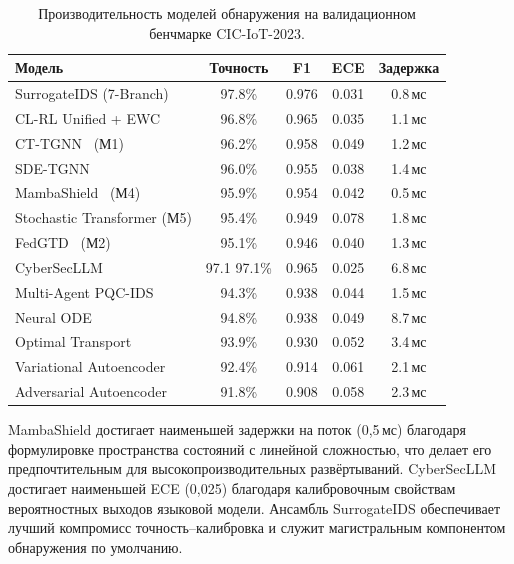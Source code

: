 \begin{table}[htbp]
\centering
\caption{Производительность моделей обнаружения на валидационном бенчмарке CIC-IoT-2023.}
\label{tab:platform_models}
\small
\begin{tabular}{lcccc}
\toprule
\textbf{Модель} & \textbf{Точность} & \textbf{F1} & \textbf{ECE} & \textbf{Задержка} \\
\midrule
SurrogateIDS (7-Branch)   & 97.8\% & 0.976 & 0.031 & 0.8\,мс \\
CL-RL Unified + EWC      & 96.8\% & 0.965 & 0.035 & 1.1\,мс \\
CT-TGNN~\cite{Anaedevha2025cais} (М1)              & 96.2\% & 0.958 & 0.049 & 1.2\,мс \\
SDE-TGNN~\cite{Anaedevha2026sdetgnn}                  & 96.0\% & 0.955 & 0.038 & 1.4\,мс \\
MambaShield~\cite{Anaedevha2026mamba} (М4)          & 95.9\% & 0.954 & 0.042 & 0.5\,мс \\
Stochastic Transformer (М5) & 95.4\% & 0.949 & 0.078 & 1.8\,мс \\
FedGTD~\cite{Anaedevha2026neurips} (М2)               & 95.1\% & 0.946 & 0.040 & 1.3\,мс \\
CyberSecLLM~\cite{Anaedevha2026cybersecllm}               & 97.1 97.1\% & 0.965 & 0.025 & 6.8\,мс \\
Multi-Agent PQC-IDS       & 94.3\% & 0.938 & 0.044 & 1.5\,мс \\
Neural ODE                & 94.8\% & 0.938 & 0.049 & 8.7\,мс \\
Optimal Transport         & 93.9\% & 0.930 & 0.052 & 3.4\,мс \\
Variational Autoencoder   & 92.4\% & 0.914 & 0.061 & 2.1\,мс \\
Adversarial Autoencoder   & 91.8\% & 0.908 & 0.058 & 2.3\,мс \\
\bottomrule
\end{tabular}
\end{table}

MambaShield достигает наименьшей задержки на поток (0,5\,мс) благодаря формулировке пространства состояний с линейной сложностью, что делает его предпочтительным для высокопроизводительных развёртываний. CyberSecLLM достигает наименьшей ECE (0,025) благодаря калибровочным свойствам вероятностных выходов языковой модели. Ансамбль SurrogateIDS обеспечивает лучший компромисс точность--калибровка и служит магистральным компонентом обнаружения по умолчанию.

